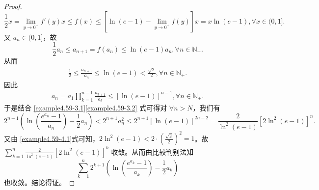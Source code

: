 \documentclass[../../main.tex]{subfiles}
\begin{document}
\begin{proof}
\[
\frac{1}{2} x = \lim_{y \to 0^+} f'(y) x \leqslant  f(x) \leqslant  [\ln(e - 1) - \lim_{y \to 0^+} f(y)] x = x \ln(e - 1),\forall x \in (0, 1].
\]
又 \(a_n \in (0, 1]\)，故
\[
\frac{1}{2} a_n \leqslant  a_{n + 1} = f(a_n) \leqslant  \ln(e - 1) a_n,\forall n \in \mathbb{N}_+.
\]
从而
\begin{align}
\frac{1}{2} \leqslant  \frac{a_{n + 1}}{a_n} \leqslant  \ln(e - 1) < \frac{\sqrt{2}}{2},\forall n \in \mathbb{N}_+. \label{example4.59-4.1} 
\end{align}
因此
\begin{align}
a_n = a_1 \prod_{k = 1}^{n - 1} \frac{a_{k + 1}}{a_k} \leqslant  [\ln(e - 1)]^{n - 1},\forall n \in \mathbb{N}_+. \label{example4.59-3.2}
\end{align}
于是结合 \eqref{example4.59-3.1}\eqref{example4.59-3.2} 式可得对 \(\forall n > N\)，我们有
\[
2^{n + 1}\left(\ln\left(\frac{e^{a_n} - 1}{a_n}\right) - \frac{1}{2} a_n\right) < 2^{n + 1} a_n^2 \leqslant  2^{n + 1}[\ln(e - 1)]^{2n - 2} = \frac{2}{\ln^2(e - 1)}[2\ln^2(e - 1)]^n.
\]
又由 \eqref{example4.59-4.1}式可知，\(2\ln^2(e - 1) < 2\cdot\left(\frac{\sqrt{2}}{2}\right)^2 = 1\)。故 \(\sum_{k = 1}^n \frac{2}{\ln^2(e - 1)}[2\ln^2(e - 1)]^k\) 收敛。从而由比较判别法知$$\sum_{k = 1}^n 2^{k + 1}\left(\ln\left(\frac{e^{a_k} - 1}{a_k}\right)- \frac{1}{2} a_k\right)$$也收敛。结论得证。
\end{proof}
\end{document}
